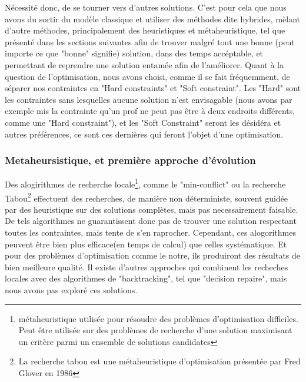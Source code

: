 Nécessité donc, de se tourner vers d'autres solutions.
\newline
\indent
C'est pour cela que nous avons du sortir du modèle classique et utiliser des méthodes dite hybrides, mèlant d'autre méthodes, principalement des heuristiques et métaheuristique, tel que présenté dans les sections suivantes afin de trouver malgré tout une bonne (peut importe ce que "bonne" signifie) solution, dans des temps accéptable, et permettant de reprendre une solution entamée afin de l'améliorer. \newline
Quant à la question de l'optimisation, nous avons choisi, comme il se fait fréquemment, de séparer nos contraintes en "Hard constraints" et "Soft constraint".  Les "Hard" sont les contraintes sans lesquelles aucune solution n'est envisagable (nous avons par exemple mis la contrainte qu'un prof ne peut pas être à deux endroits différents, comme une "Hard constraint"), et les "Soft Constraint" seront les désidéra et autres préférences, ce sont ces dernières qui feront l'objet d'une optimisation. 
\subsubsection{Metaheursistique, et première approche d'évolution}
Des alogirithmes de recherche locale\footnote{métaheuristique utilisée pour résoudre des problèmes d'optimisation difficiles. Peut être utilisée sur des problèmes de recherche d'une solution maximisant un critère parmi un ensemble de solutions candidates}, comme le "min-conflict" ou la recherche Tabou\footnote{La recherche tabou est une métaheuristique d'optimisation présentée par Fred Glover en 1986} effectuent des recherches, de manière non déterministe, souvent guidée par des heuristique sur des solutions complètes, mais pas necessairement faisable.  
De tels algorithmes ne guarantissent donc pas de trouver une solution respectant toutes les contraintes, mais tente de s'en raprocher. Cependant, ces alogorithmes peuvent être bien plus efficace(en temps de calcul) que celles systématique. Et pour des problèmes d'optimisation comme le notre, ils produiront des résultats de bien meilleure qualité.
Il existe d'autres approches qui combinent les recheches locales avec des algorithmes de "backtracking", tel que "decision repaire", mais nous avons pas exploré ces solutions.

